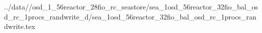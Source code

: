 ../data//osd_1_56reactor_28fio_rc_seastore/sea_1osd_56reactor_32fio_bal_osd_rc_1procs_randwrite_d/sea_1osd_56reactor_32fio_bal_osd_rc_1procs_randwrite.tex